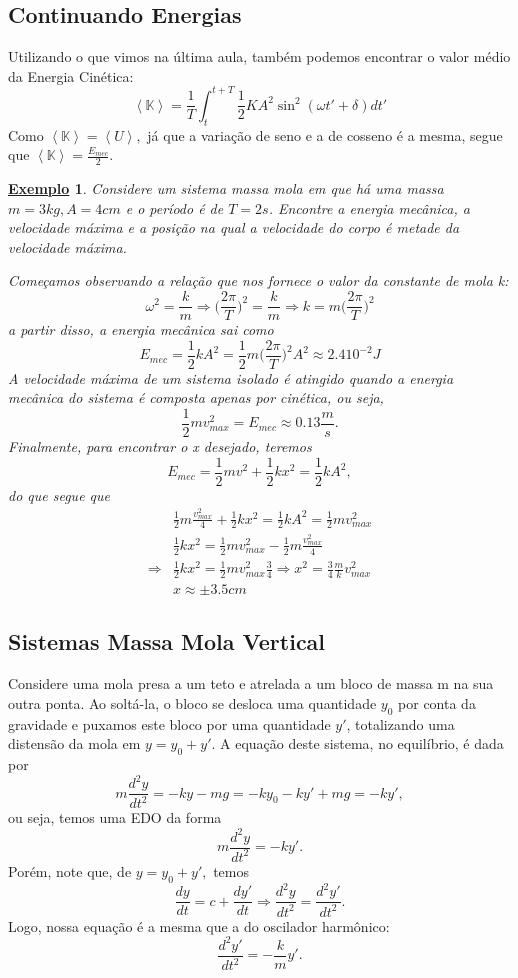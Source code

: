 \documentclass{article}
\newtheorem{example}{\underline{Exemplo}}
\begin{document}
\subsection{Continuando Energias}
Utilizando o que vimos na última aula, também podemos encontrar o valor médio da Energia Cinética: 
\[
  \left< \mathbb{K} \right> = \frac{1}{T}\int_{t}^{t+T}\frac{1}{2}KA^{2}\sin^{2}{(\omega t'+\delta )}dt'
\] 
Como \(\left< \mathbb{K} \right> = \left< U \right>,\) já que a variação de seno e a de cosseno é a mesma, segue que \(\left< \mathbb{K} \right> = \frac{E_{mec}}{2}\).
\begin{example}
  Considere um sistema massa mola em que há uma massa \(m=3kg, A = 4cm\) e o período é de \(T=2s\). Encontre a energia mecânica, a velocidade máxima e a posição na qual
  a velocidade do corpo é metade da velocidade máxima.

  Começamos observando a relação que nos fornece o valor da constante de mola k: 
  \[
    \omega ^{2} = \frac{k}{m} \Rightarrow \biggl(\frac{2\pi }{T}\biggr)^{2} = \frac{k}{m} \Rightarrow k = m \biggl(\frac{2\pi }{T}\biggr)^{2}
  \]
  a partir disso, a energia mecânica sai como 
  \[
    E_{mec} = \frac{1}{2}kA^{2} = \frac{1}{2}m \biggl(\frac{2\pi }{T}\biggr)^{2}A^{2}\approx 2.4 10^{-2}J
  \]
  A velocidade máxima de um sistema isolado é atingido quando a energia mecânica do sistema é composta apenas por cinética, ou seja, 
  \[
    \frac{1}{2}mv_{max}^{2} = E_{mec}\approx 0.13\frac{m}{s}.
  \]
  Finalmente, para encontrar o x desejado, teremos 
  \[
    E_{mec} = \frac{1}{2}mv^{2} + \frac{1}{2}kx^{2} = \frac{1}{2}kA^{2},
  \]
  do que segue que 
  \begin{align*}
   &\frac{1}{2}m \frac{v_{max}^{2}}{4} + \frac{1}{2}kx^{2} = \frac{1}{2} kA^{2} = \frac{1}{2}mv_{max}^{2}\\
   &\frac{1}{2}kx^{2}=\frac{1}{2}mv_{max}^{2}-\frac{1}{2}m \frac{v_{max}^{2}}{4}\\
    \Rightarrow &\frac{1}{2}kx^{2} = \frac{1}{2}mv_{max}^{2}\frac{3}{4} \Rightarrow x^{2} = \frac{3}{4}\frac{m}{k}v_{max}^{2}\\
                & x\approx\pm 3.5cm 
  \end{align*}
\end{example}
\subsection{Sistemas Massa Mola Vertical}

Considere uma mola presa a um teto e atrelada a um bloco de massa m na sua outra ponta. Ao soltá-la, o bloco
se desloca uma quantidade \(y_{0}\) por conta da gravidade e puxamos este bloco por uma quantidade \(y'\), totalizando
uma distensão da mola em \(y = y_{0}+y'.\) A equação deste sistema, no equilíbrio, é dada por 
\[
  m \frac{d^{2}y}{dt^{2}} = -ky - mg = -ky_{0}-ky'+mg = - ky',
\]
ou seja, temos uma EDO da forma 
\[
  m \frac{d^{2}y}{dt^{2}} = -ky'.
\]
Porém, note que, de \(y=y_{0} + y',\) temos 
\[
  \frac{dy}{dt} = c + \frac{dy'}{dt} \Rightarrow \frac{d^{2}y}{dt^{2}} = \frac{d^{2}y'}{dt^{2}}.
\]
Logo, nossa equação é a mesma que a do oscilador harmônico:
\[
  \frac{d^{2}y'}{dt^{2}} = -\frac{k}{m}y'.
\]
\end{document}
